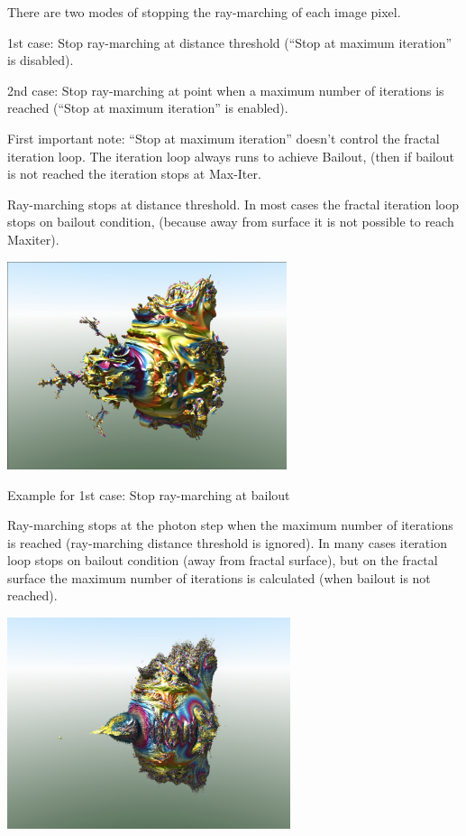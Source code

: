 There are two modes of stopping the ray-marching of each image pixel.

1st case: Stop ray-marching at distance threshold (``Stop at maximum
iteration'' is disabled).

\protect\hypertarget{__DdeLink__1111_813559202}{}{}2nd case: Stop
ray-marching at point when a maximum number of iterations is reached
(``Stop at maximum iteration'' is enabled).

First important note: ``Stop at maximum iteration'' doesn't control the
fractal iteration loop. The iteration loop always runs to achieve
Bailout, (then if bailout is not reached the iteration stops at
Max-Iter.

Ray-marching stops at distance threshold. In most cases the fractal
iteration loop stops on bailout condition, (because away from surface it
is not possible to reach Maxiter).

\includegraphics[width=3.22795in,height=2.40000in]{img/manual/media/image7.png}

Example for 1st case: Stop ray-marching at bailout

Ray-marching stops at the photon step when the maximum number of
iterations is reached (ray-marching distance threshold is ignored). In
many cases iteration loop stops on bailout condition (away from fractal
surface), but on the fractal surface the maximum number of iterations is
calculated (when bailout is not reached).

\includegraphics[width=3.26890in,height=2.44016in]{img/manual/media/image8.png}

